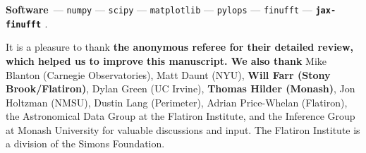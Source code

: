 \documentclass[modern, linenumbers]{aastex631}
\renewcommand{\paragraph}[1]{\medskip\par\noindent\textbf{#1}~---}
\newcommand{\modified}[1]{\textcolor{Emerald}{\textbf{#1}}}
\begin{document}
\paragraph{Software}
\texttt{numpy} \citep{numpy} ---
\texttt{scipy} \citep{scipy} ---
\texttt{matplotlib} \citep{matplotlib} ---
\texttt{pylops} \citep{pylops} ---
\texttt{finufft} \citep{finufft} ---
\modified{\texttt{jax-finufft} \citep{jax-finufft}}.

\begin{acknowledgments}
It is a pleasure to thank \modified{the anonymous referee for their detailed review, which helped us to improve this manuscript. We also thank}
    Mike Blanton (Carnegie Observatories),
    Matt Daunt (NYU),
    \modified{Will Farr (Stony Brook/Flatiron)},
    Dylan Green (UC Irvine),
    \modified{Thomas Hilder (Monash)},
    Jon Holtzman (NMSU),
    Dustin Lang (Perimeter),
    Adrian Price-Whelan (Flatiron),
    the Astronomical Data Group at the Flatiron Institute,
    and the Inference Group at Monash University
for valuable discussions and input.
The Flatiron Institute is a division of the Simons Foundation.
\end{acknowledgments}
\end{document}
